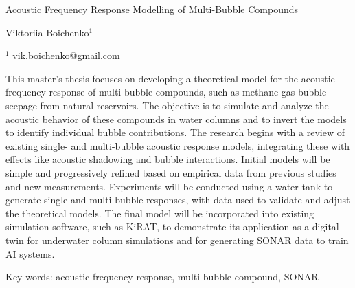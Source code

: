         
        
       


\Large
 \begin{center}
    Acoustic Frequency Response Modelling of Multi-Bubble Compounds

\hspace{10pt}

\large
Viktoriia Boichenko$^1$ \\

\hspace{10pt}

\small  
$^1$ vik.boichenko@gmail.com\\

\end{center}

\hspace{10pt}

\normalsize

This master's thesis focuses on developing a theoretical model for the acoustic frequency response of multi-bubble compounds, such as methane gas bubble seepage from natural reservoirs. The objective is to simulate and analyze the acoustic behavior of these compounds in water columns and to invert the models to identify individual bubble contributions. The research begins with a review of existing single- and multi-bubble acoustic response models, integrating these with effects like acoustic shadowing and bubble interactions. Initial models will be simple and progressively refined based on empirical data from previous studies and new measurements. Experiments will be conducted using a water tank to generate single and multi-bubble responses, with data used to validate and adjust the theoretical models. The final model will be incorporated into existing simulation software, such as KiRAT, to demonstrate its application as a digital twin for underwater column simulations and for generating SONAR data to train AI systems.

Key words: acoustic frequency response, multi-bubble compound, SONAR